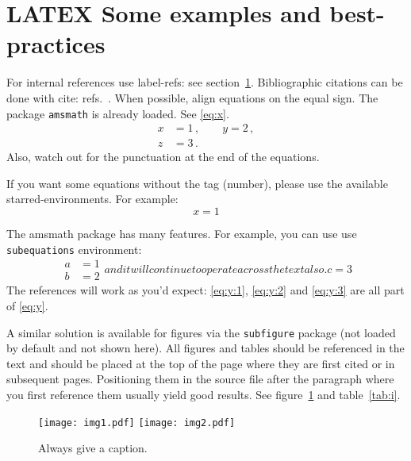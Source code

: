 \documentclass[a4paper,11pt]{article}
\theoremstyle{definition}
\begin{document}
\iffalse

\section{LATEX Some examples and best-practices}
\label{sec:intro}

For internal references use label-refs: see section~\ref{sec:intro}.
Bibliographic citations can be done with cite: refs.~\cite{a,b,c}.
When possible, align equations on the equal sign. The package
\texttt{amsmath} is already loaded. See \eqref{eq:x}.
\begin{equation}
\label{eq:x}
\begin{split}
x &= 1 \,,
\qquad
y = 2 \,,
\\
z &= 3 \,.
\end{split}
\end{equation}
Also, watch out for the punctuation at the end of the equations.


If you want some equations without the tag (number), please use the available
starred-environments. For example:
\begin{equation*}
x = 1
\end{equation*}

The amsmath package has many features. For example, you can use use
\texttt{subequations} environment:
\begin{subequations}\label{eq:y}
\begin{align}
\label{eq:y:1}
a & = 1
\\
\label{eq:y:2}
b & = 2
\end{align}
and it will continue to operate across the text also.
\begin{equation}
\label{eq:y:3}
c = 3
\end{equation}
\end{subequations}
The references will work as you'd expect: \eqref{eq:y:1},
\eqref{eq:y:2} and \eqref{eq:y:3} are all part of \eqref{eq:y}.

A similar solution is available for figures via the \texttt{subfigure}
package (not loaded by default and not shown here). 
All figures and tables should be referenced in the text and should be
placed at the top of the page where they are first cited or in
subsequent pages. Positioning them in the source file
after the paragraph where you first reference them usually yield good
results. See figure~\ref{fig:i} and table~\ref{tab:i}.

\begin{figure}[tbp]
\centering %
\texttt{[image: img1.pdf]}
\hfill
\texttt{[image: img2.pdf]}
\caption{\label{fig:i} Always give a caption.}
\end{figure}
\end{document}
